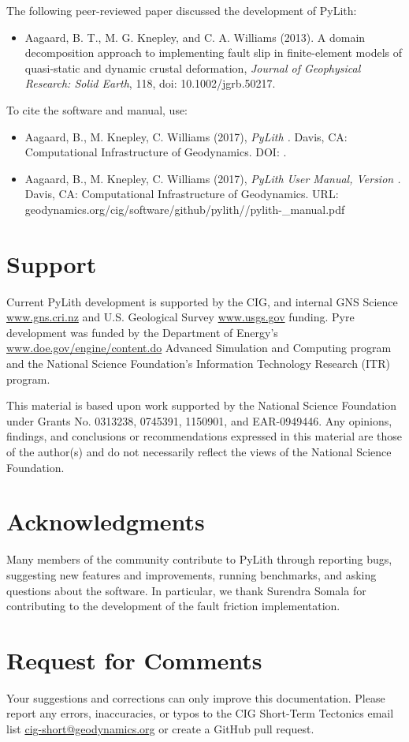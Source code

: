 The following peer-reviewed paper discussed the development of PyLith:
\begin{itemize}
\item Aagaard, B. T., M. G. Knepley, and C. A. Williams (2013). A
  domain decomposition approach to implementing fault slip in
  finite-element models of quasi-static and dynamic crustal
  deformation, \textit{Journal of Geophysical Research: Solid Earth},
  118, doi: 10.1002/jgrb.50217.
\end{itemize}
To cite the software and manual, use:
\begin{itemize}
\item Aagaard, B., M. Knepley, C. Williams (2017), \emph{PyLith
  \pylithVersion.} Davis, CA: Computational Infrastructure of
  Geodynamics. DOI: \pylithDOI.
\item Aagaard, B., M. Knepley, C. Williams (2017), \emph{PyLith User
  Manual, Version \pylithVersionNumber.} Davis, CA: Computational
  Infrastructure of Geodynamics. URL:
  geodynamics.org/cig/software/github/pylith/\pylithVersion/pylith-\pylithVersionNumber\_manual.pdf
\end{itemize}

\section{Support}

Current PyLith development is supported by the CIG, and internal GNS
Science \url{www.gns.cri.nz} and U.S. Geological Survey \url{www.usgs.gov}
funding. Pyre development was funded by the Department of Energy's
\url{www.doe.gov/engine/content.do} Advanced Simulation and Computing
program and the National Science Foundation's Information Technology
Research (ITR) program.

This material is based upon work supported by the National Science
Foundation under Grants No. 0313238, 0745391, 1150901, and
EAR-0949446. Any opinions, findings, and conclusions or
recommendations expressed in this material are those of the author(s)
and do not necessarily reflect the views of the National Science
Foundation.


\section{Acknowledgments}

Many members of the community contribute to PyLith through reporting
bugs, suggesting new features and improvements, running benchmarks,
and asking questions about the software. In particular, we thank Surendra
Somala for contributing to the development of the fault friction implementation.


\section{Request for Comments}

Your suggestions and corrections can only improve this documentation.
Please report any errors, inaccuracies, or typos to the CIG Short-Term
Tectonics email list \url{cig-short@geodynamics.org} or create a
GitHub pull request.
